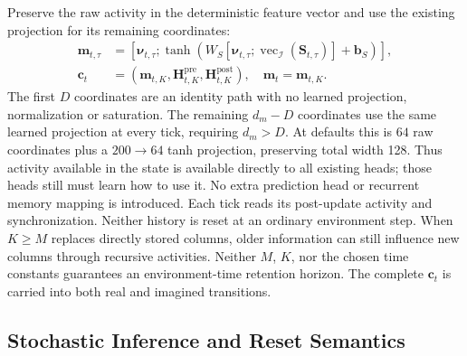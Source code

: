 \documentclass{article}
\begin{document}
Preserve the raw activity in the deterministic feature vector and use the existing projection for its remaining coordinates:
\begin{align}
\mathbf m_{t,\tau}&=\left[\boldsymbol\nu_{t,\tau};\tanh\!\left(W_S
[\boldsymbol\nu_{t,\tau};\operatorname{vec}_{\mathcal I}(\mathbf S_{t,\tau})]
+\mathbf b_S\right)\right],
\label{eq:ct_sync_context}\\
\mathbf c_t&=(\mathbf m_{t,K},\mathbf H_{t,K}^{\mathrm{pre}},\mathbf H_{t,K}^{\mathrm{post}}),
\quad\mathbf m_t=\mathbf m_{t,K}.
\label{eq:ct_persistent_carry}
\end{align}
The first $D$ coordinates are an identity path with no learned projection, normalization or saturation. The remaining $d_m-D$ coordinates use the same learned projection at every tick, requiring $d_m>D$. At defaults this is $64$ raw coordinates plus a $200\to64$ tanh projection, preserving total width 128. Thus activity available in the state is available directly to all existing heads; those heads still must learn how to use it. No extra prediction head or recurrent memory mapping is introduced. Each tick reads its post-update activity and synchronization. Neither history is reset at an ordinary environment step. When $K\ge M$ replaces directly stored columns, older information can still influence new columns through recursive activities. Neither $M$, $K$, nor the chosen time constants guarantees an environment-time retention horizon. The complete $\mathbf c_t$ is carried into both real and imagined transitions.

\subsection{Stochastic Inference and Reset Semantics}
\end{document}
